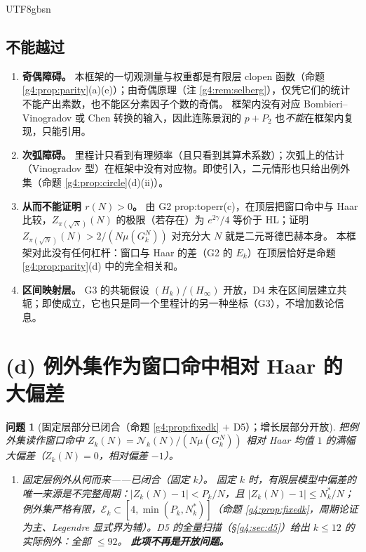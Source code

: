 \documentclass[11pt,a4paper]{article}
\newcommand{\Haar}{\mu}
\newcommand{\Cnt}{\mathcal N}          %
\newcommand{\Exc}{\mathcal E}          %
\theoremstyle{plain}
\newtheorem{quest}[prop]{问题}
\theoremstyle{definition}
\begin{document}
\begin{CJK}{UTF8}{gbsn}
\subsection{不能越过}
\begin{enumerate}[leftmargin=*]
\item \textbf{奇偶障碍。} 本框架的一切观测量与权重都是有限层 clopen 函数（命题 \ref{g4:prop:parity}(a)(e)）；由奇偶原理（注 \ref{g4:rem:selberg}），仅凭它们的统计不能产出素数，也不能区分素因子个数的奇偶。
框架内没有对应 Bombieri--Vinogradov 或 Chen 转换的输入，因此连陈景润的 $p+P_2$ 也\emph{不能}在框架内复现，只能引用。
\item \textbf{次弧障碍。} 里程计只看到有理频率（且只看到其算术系数）；次弧上的估计（Vinogradov 型）在框架中没有对应物。即使引入，二元情形也只给出例外集（命题 \ref{g4:prop:circle}(d)(ii)）。
\item \textbf{从而不能证明 $r(N)>0$。} 由 G2 prop:toperr(c)，在顶层把窗口命中与 Haar 比较，$Z_{\pi(\sqrt N)}(N)$ 的极限（若存在）为 $e^{2\gamma}/4$ 等价于 HL；证明 $Z_{\pi(\sqrt N)}(N)>2/(N\Haar(G_k^N))$ 对充分大 $N$ 就是二元哥德巴赫本身。
本框架对此没有任何杠杆：窗口与 Haar 的差（G2 的 $E_k$）在顶层恰好是命题 \ref{g4:prop:parity}(d) 中的完全相关和。
\item \textbf{区间映射层。} G3 的共轭假设 $(H_k)$/$(H_\infty)$ 开放，D4 未在区间层建立共轭；即使成立，它也只是同一个里程计的另一种坐标（G3），不增加数论信息。
\end{enumerate}

\section{(d) 例外集作为窗口命中相对 Haar 的大偏差}\label{g4:sec:ld}

\begin{quest}[固定层部分已闭合（命题 \ref{g4:prop:fixedk} $+$ D5）；增长层部分开放]\label{g4:quest:ld}
把例外集读作窗口命中 $Z_k(N)=\Cnt_k(N)/(N\Haar(G_k^N))$ 相对 Haar 均值 $1$ 的\emph{满幅}大偏差（$Z_k(N)=0$，相对偏差 $-1$）。
\begin{enumerate}[label=(\roman*)]
\item \emph{固定层例外从何而来——已闭合（固定 $k$）。} 固定 $k$ 时，有限层模型中偏差的唯一来源是不完整周期：$|Z_k(N)-1|<P_k/N$，且 $|Z_k(N)-1|\le N_k^*/N$；
例外集严格有限，$\Exc_k\subset[4,\min(P_k,N_k^*)]$（命题 \ref{g4:prop:fixedk}，周期论证为主、Legendre 显式界为辅）。D5 \cite{D5} 的全量扫描（\S\ref{g4:sec:d5}）给出 $k\le12$ 的实际例外：全部 $\le92$。
\textbf{此项不再是开放问题。}


\end{enumerate}
\end{quest}
\end{CJK}
\end{document}
